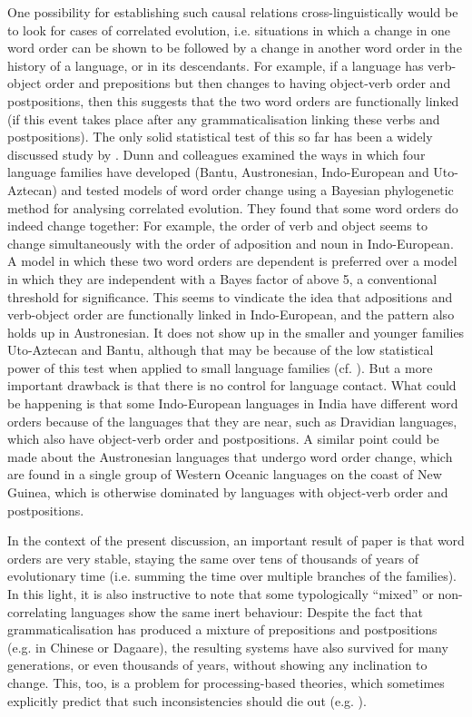 \documentclass[output=paper]{langsci/langscibook}
\begin{document}
One possibility for establishing such causal relations cross-linguistically would be to look for cases of correlated evolution, i.e. situations in which a change in one word order can be shown to be followed by a change in another word order in the history of a language, or in its descendants. For example, if a language has verb-object order and prepositions but then changes to having object-verb order and postpositions, then this suggests that the two word orders are functionally linked (if this event takes place after any grammaticalisation linking these verbs and postpositions). The only solid statistical test of this so far has been a widely discussed study by \citet{DunnEtAl2011}. Dunn and colleagues examined the ways in which four language families have developed (Bantu, Austronesian, Indo-European and Uto-Aztecan) and tested models of word order change using a Bayesian phylogenetic method for analysing correlated evolution. They found that some word orders do indeed change together: For example, the order of verb and object seems to change simultaneously with the order of adposition and noun in Indo-European. A model in which these two word orders are dependent is preferred over a model in which they are independent with a Bayes factor of above 5, a conventional threshold for significance. This seems to vindicate the idea that adpositions and verb-object order are functionally linked in Indo-European, and the pattern also holds up in Austronesian. It does not show up in the smaller and younger families Uto-Aztecan and Bantu, although that may be because of the low statistical power of this test when applied to small language families (cf. \citealt{CroftEtAl2011}). But a more important drawback is that there is no control for language contact. What could be happening is that some Indo-European languages in India have different word orders because of the languages that they are near, such as Dravidian languages, which also have object-verb order and postpositions.  A similar point could be made about the Austronesian languages that undergo word order change, which are found in a single group of Western Oceanic languages on the coast of New Guinea, which is otherwise dominated by languages with object-verb order and postpositions.

In the context of the present discussion, an important result of  paper is that word orders are very stable, staying the same over tens of thousands of years of evolutionary time (i.e. summing the time over multiple branches of the families). In this light, it is also instructive to note that some typologically “mixed” or non-correlating languages show the same inert behaviour: Despite the fact that grammaticalisation has produced a mixture of prepositions and postpositions (e.g. in Chinese or Dagaare), the resulting systems have also survived for many generations, or even thousands of years, without showing any inclination to change. This, too, is a problem for processing-based theories, which sometimes explicitly predict that such inconsistencies should die out (e.g. \citealt{KirbyHurford1997}).
\end{document}
